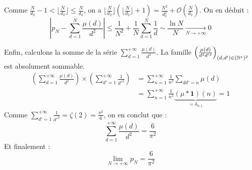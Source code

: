 \begin{solution}
Comme $\frac{N}{d_2} - 1 < \lfloor \frac{N}{d_2} \rfloor \leq \frac{N}{d_2}$, on a $\lfloor \frac{N}{d_2} \rfloor \left( \lfloor \frac{N}{d_2} \rfloor + 1 \right) = \frac{N^2}{d_2^2} + \mathcal{O}\left(\frac{N}{d_2}\right)$.
On en déduit :
\[ \left| p_N - \sum_{d=1}^N \frac{\mu(d)}{d^2} \right| \leq \frac{1}{N^2} + \frac{1}{N} \sum_{d=1}^N \frac{1}{d} \sim \frac{\ln N}{N} \xrightarrow[N \to +\infty]{} 0 \]

Enfin, calculons la somme de la série $\sum_{d=1}^{+\infty} \frac{\mu(d)}{d^2}$.
La famille $\left( \frac{\mu(d)}{d^2 d'^2} \right)_{(d,d') \in (\mathbb N^*)^2}$ est absolument sommable.
\begin{align*}
\left( \sum_{d=1}^{+\infty} \frac{\mu(d)}{d^2} \right) \times \left( \sum_{d'=1}^{+\infty} \frac{1}{d'^2} \right) &= \sum_{n=1}^{+\infty} \frac{1}{n^2} \sum_{d d' = n} \mu(d) \\
&= \sum_{n=1}^{+\infty} \frac{1}{n^2} \underbrace{(\mu * \mathbf{1})(n)}_{= \delta_{n,1}} = 1
\end{align*}
Comme $\sum_{d'=1}^{+\infty} \frac{1}{d'^2} = \zeta(2) = \frac{\pi^2}{6}$, on en conclut que :
\[ \sum_{d=1}^{+\infty} \frac{\mu(d)}{d^2} = \frac{6}{\pi^2} \]
Et finalement :
\[ \boxed{\lim_{N \to +\infty} p_N = \frac{6}{\pi^2}} \]
\end{solution}
